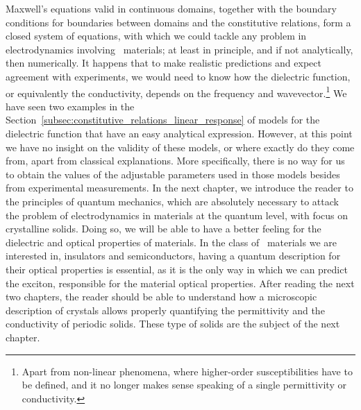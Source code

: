 Maxwell's equations valid in continuous domains, together with the boundary conditions for boundaries between domains and the constitutive relations, form a closed system of equations, with which we could tackle any problem in electrodynamics involving \bd~materials; at least in principle, and if not analytically, then numerically.
It happens that to make realistic predictions and expect agreement with experiments, we would need to know how the dielectric function, or equivalently the conductivity, depends on the frequency and wavevector.\footnote{Apart from non-linear phenomena, where higher-order susceptibilities have to be defined, and it no longer makes sense speaking of a single permittivity or conductivity.}
We have seen two examples in the Section~\ref{subsec:constitutive_relations_linear_response} of models for the dielectric function that have an easy analytical expression.
However, at this point we have no insight on the validity of these models, or where exactly do they come from, apart from classical explanations.
More specifically, there is no way for us to obtain the values of the adjustable parameters used in those models besides from experimental measurements.
In the next chapter, we introduce the reader to the principles of quantum mechanics, which are absolutely necessary to attack the problem of electrodynamics in materials at the quantum level, with focus on crystalline solids.
Doing so, we will be able to have a better feeling for the dielectric and optical properties of materials.
In the class of \bd~materials we are interested in, insulators and semiconductors, having a quantum description for their optical properties is essential, as it is the only way in which we can predict the exciton, responsible for the material optical properties.
After reading the next two chapters, the reader should be able to understand how a microscopic description of crystals allows properly quantifying the permittivity and the conductivity of periodic solids.
These type of solids are the subject of the next chapter.
